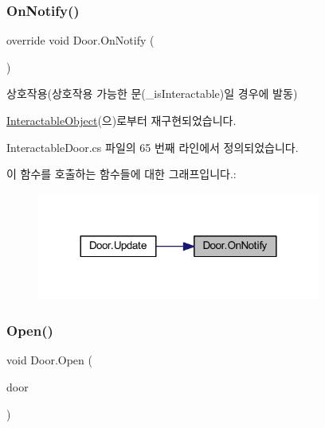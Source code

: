\subsubsection{\texorpdfstring{OnNotify()}{OnNotify()}}
{\footnotesize\ttfamily override void Door.\+On\+Notify (\begin{DoxyParamCaption}{ }\end{DoxyParamCaption})\hspace{0.3cm}{\ttfamily [virtual]}}



상호작용(상호작용 가능한 문(\+\_\+is\+Interactable)일 경우에 발동) 



\mbox{\hyperlink{class_interactable_object_aa5c752d17471fe0daf58a4d00c218a29}{Interactable\+Object}}(으)로부터 재구현되었습니다.



Interactable\+Door.\+cs 파일의 65 번째 라인에서 정의되었습니다.


\begin{DoxyCode}{0}

\end{DoxyCode}
이 함수를 호출하는 함수들에 대한 그래프입니다.\+:
\nopagebreak
\begin{figure}[H]
\begin{center}
\leavevmode
\includegraphics[width=264pt]{da/d30/class_door_a12cc0e80dc33ddd336dccc52466c2c50_icgraph}
\end{center}
\end{figure}
\mbox{\label{class_door_a31b8ff949e85dddb2585afa106fa5d05}} 
\subsubsection{\texorpdfstring{Open()}{Open()}}
{\footnotesize\ttfamily void Door.\+Open (\begin{DoxyParamCaption}\item[{Game\+Object}]{door }\end{DoxyParamCaption})}



